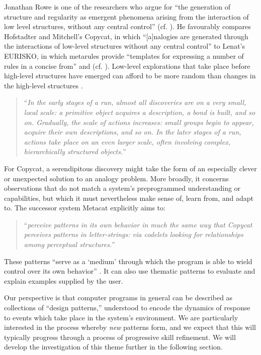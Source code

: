\documentclass{llncs}
\begin{document}
Jonathan Rowe \cite{rowe1994creativity} is one of the researchers who
argue for ``the generation of structure and regularity as emergent
phenomena arising from the interaction of low level structures,
without any central control'' (cf. \cite{pearce-boden-and-beyond}).
He favourably compares Hofstadter and Mitchell's {\sf Copycat}, in
which ``[a]nalogies are generated through the interactions of
low-level structures without any central control'' to Lenat's {\sf
  EURISKO}, in which metarules provide ``templates for expressing a
number of rules in a concise from'' and
(cf. \cite{hofstadter1994copycat,mitchell1993analogy}).
%
Low-level explorations that take place before high-level structures
have emerged can afford to be more random than changes in the
high-level structures \cite[pp. 232--233]{hofstadter1994copycat}.
\begin{quote}
``\emph{In the early stages of a run, almost all discoveries are on a
    very small, local scale: a primitive object acquires a
    description, a bond is built, and so on.  Gradually, the scale of
    actions increases: small groups begin to appear, acquire their own
    descriptions, and so on.  In the later stages of a run, actions
    take place on an even larger scale, often involving complex,
    hierarchically structured objects.}''
  \cite[p. 228]{hofstadter1994copycat}
\end{quote}

For {\sf Copycat}, a serendipitous discovery might take
the form of an especially clever or unexpected solution to an analogy
problem.  More broadly, it concerns observations that do not match a
system's preprogrammed understanding or capabilities, but which it
must nevertheless make sense of, learn from, and adapt to.  The
successor system {\sf Metacat} explicitly aims to:
\begin{quote}
``\emph{perceive patterns in its own behavior in much the same way
    that Copycat perceives patterns in letter-strings: via codelets
    looking for relationships among perceptual
    structures.}''~\cite{DBLP:journals/jetai/Marshall06}
\end{quote}

These patterns ``serve as a `medium' through which the program is able
to wield control over its own behavior''
\cite{DBLP:journals/jetai/Marshall06}.  It can also use thematic
patterns to evaluate and explain examples supplied by the user.

Our perspective is that computer programs in general can be described
as collections of ``design patterns,'' understood to encode the
dynamics of response to events which take place in the system's
environment.  We are particularly interested in the process whereby
\emph{new} patterns form, and we expect that this will typically
progress through a process of progressive skill refinement.  We will
develop the investigation of this theme further in the following
section.
\end{document}
